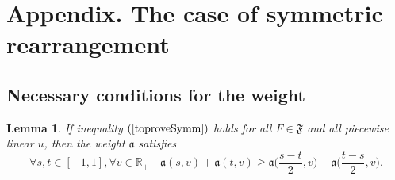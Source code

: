 \documentclass[12pt]{article}
\newcommand{\Real}{\mathbb R}
\renewcommand{\ge}{\geqslant}
\newtheorem{lm}{Lemma}
\begin{document}
\section{Appendix. The case of symmetric rearrangement}

\subsection{Necessary conditions for the weight}

\begin{lm}
If inequality $(\ref{toproveSymm})$ holds for all $F \in \mathfrak{F}$
and all piecewise linear $u$, then
the weight $\mathfrak a$ satisfies
\begin{equation}
\label{almostConvex}
\forall s, t \in [-1, 1], \forall v \in \Real_+ \quad
\mathfrak a( s, v ) + \mathfrak a( t, v ) \ge \mathfrak a\Big( \frac{ s - t }{2}, v \Big) + \mathfrak a\Big( \frac{ t - s }{2}, v \Big).
\end{equation}
\end{lm}
\end{document}
